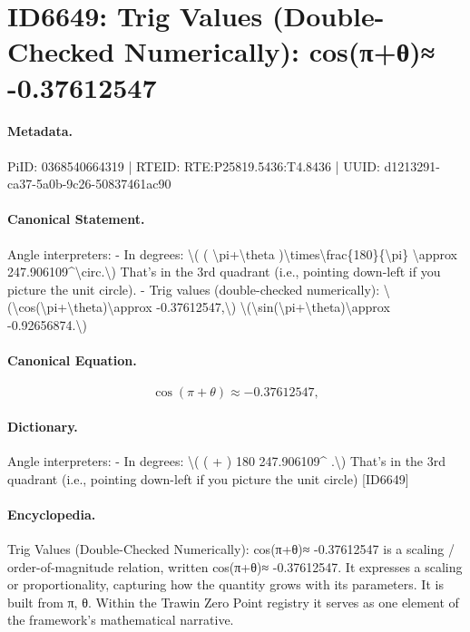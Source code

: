 \section*{ID6649: Trig Values (Double-Checked Numerically): cos(π+θ)≈ -0.37612547}
\paragraph{Metadata.}
PiID: 0368540664319 | RTEID: RTE:P25819.5436:T4.8436 | UUID: d1213291-ca37-5a0b-9c26-50837461ac90

\paragraph{Canonical Statement.}
Angle interpreters: - In degrees: \textbackslash{}( ( \textbackslash{}pi+\textbackslash{}theta )\textbackslash{}times\textbackslash{}frac\{180\}\{\textbackslash{}pi\} \textbackslash{}approx 247.906109\textasciicircum{}\textbackslash{}circ.\textbackslash{}) That’s in the 3rd quadrant (i.e., pointing down-left if you picture the unit circle). - Trig values (double-checked numerically): \textbackslash{}(\textbackslash{}cos(\textbackslash{}pi+\textbackslash{}theta)\textbackslash{}approx -0.37612547,\textbackslash{}) \textbackslash{}(\textbackslash{}sin(\textbackslash{}pi+\textbackslash{}theta)\textbackslash{}approx -0.92656874.\textbackslash{})

\paragraph{Canonical Equation.}
\[
\cos(\pi+\theta)\approx -0.37612547,
\]

\paragraph{Dictionary.}
Angle interpreters: - In degrees: \textbackslash{}( ( + ) 180 247.906109\textasciicircum{} .\textbackslash{}) That’s in the 3rd quadrant (i.e., pointing down-left if you picture the unit circle) [ID6649]

\paragraph{Encyclopedia.}
Trig Values (Double-Checked Numerically): cos(π+θ)≈ -0.37612547 is a scaling / order-of-magnitude relation, written cos(π+θ)≈ -0.37612547. It expresses a scaling or proportionality, capturing how the quantity grows with its parameters. It is built from π, θ. Within the Trawin Zero Point registry it serves as one element of the framework's mathematical narrative.
